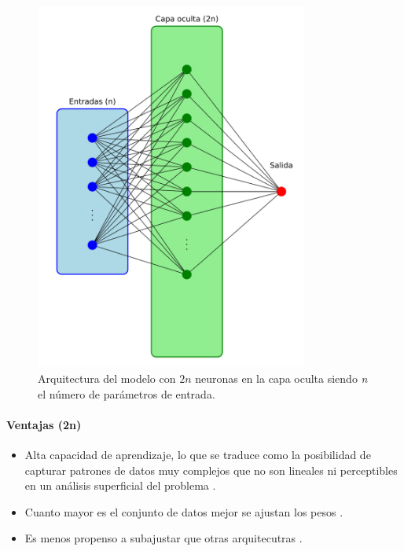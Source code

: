 \begin{figure}[H]
    \centering
    \includegraphics[width=0.8\textwidth]{./img/modelo/arquitecturas/arqnnBIN.pdf}
    \caption{Arquitectura del modelo con $2n$ neuronas en la capa oculta siendo \textit{n} el número de parámetros de entrada.}
    \label{fig:arqnnBIN}
\end{figure}

\paragraph{Ventajas (2n)}
\begin{itemize}
	\item Alta capacidad de aprendizaje, lo que se traduce como la posibilidad de capturar patrones de datos muy complejos que no son lineales ni perceptibles en un análisis superficial del problema \cite{goodfellow2016deep}.
	\item Cuanto mayor es el conjunto de datos mejor se ajustan los pesos \cite{sun2017survey}.
	\item Es menos propenso a subajustar que otras arquitecutras \cite{bishop2006pattern}.
\end{itemize}
